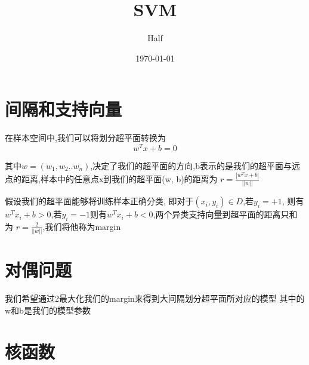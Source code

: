 \documentclass[UTF8]{ctexart}
\title{SVM}
\author{Half}
\date{\today}
\begin{document}
\maketitle
\section{间隔和支持向量}
在样本空间中,我们可以将划分超平面转换为
\begin{equation}
    w^Tx+b = 0
\end{equation}
\par 
其中$w =(w_1,w_2..w_n)$,决定了我们的超平面的方向,b表示的是我们的超平面与远点的距离,样本中的任意点x到我们的超平面(w, b)的距离为
$r = \frac{|w^Tx+b|}{||w||}$

假设我们的超平面能够将训练样本正确分类, 即对于$(x_i,y_i)\in D$,若$y_i=+1$,
则有$w^Tx_i+b >0$,若$y_i=-1$则有$w^Tx_i+b<0$,两个异类支持向量到超平面的距离只和为
$r = \frac{2}{||w||}$,我们将他称为margin
\section{对偶问题}
我们希望通过2最大化我们的margin来得到大间隔划分超平面所对应的模型
其中的w和b是我们的模型参数

\section{核函数}
\end{document}
